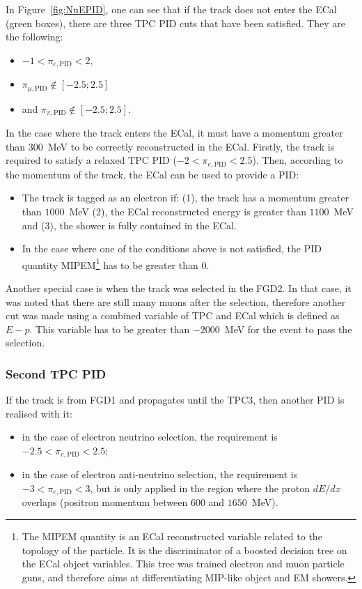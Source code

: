 In Figure~\ref{fig:NuEPID}, one can see that if the track does not
enter the \Gls{ECal} (green boxes), there are three \Gls{TPC}
\Gls{PID} cuts that have been satisfied. They are the following:
\begin{itemize}[noitemsep,topsep=0pt]
\item $-1<\pi_{e, \text{PID}} < 2$,
\item $\pi_{\mu, \text{PID}} \notin \left[-2.5;2.5\right]$
\item and $\pi_{\pi, \text{PID}} \notin \left[-2.5;2.5\right]$.
\end{itemize}

In the case where the track enters the \Gls{ECal}, it must have a
momentum greater than $300$~MeV to be correctly reconstructed in the
\Gls{ECal}. Firstly, the track is required to satisfy a relaxed
\Gls{TPC} \Gls{PID} ($-2<\pi_{e,\text{PID}} < 2.5$). Then,
according to the momentum of the track, the \Gls{ECal} can be used to
provide a \Gls{PID}:
\begin{itemize}[noitemsep,topsep=0pt]
\item The track is tagged as an electron if: (1), the track has a
  momentum greater than $1000$~MeV (2), the \Gls{ECal} reconstructed
  energy is greater than $1100$~MeV and (3), the shower is fully
  contained in the \Gls{ECal}.
\item In the case where one of the conditions above is not satisfied,
  the \Gls{PID} quantity \Gls{MIPEM}\footnote{The \Gls{MIPEM} quantity
    is an \Gls{ECal} reconstructed variable related to the topology of
    the particle. It is the discriminator of a boosted decision tree
    on the \Gls{ECal} object variables. This tree was trained electron
    and muon particle guns, and therefore aims at differentiating
    \Gls{MIP}-like object and \Gls{EM} showers.} has to be greater
  than 0.
\end{itemize}

Another special case is when the track was selected in the
\Gls{FGD}2. In that case, it was noted that there are still many muons
after the selection, therefore another cut was made using a combined
variable of \Gls{TPC} and \Gls{ECal} which is defined as $E-p$. This
variable has to be greater than $-2000$~MeV for the event to pass the
selection.

\subsubsection{Second \Gls{TPC} \Gls{PID}}
\label{subsubsec:secondtpcpid}
If the track is from \Gls{FGD}1 and propagates until the \Gls{TPC}3,
then another \Gls{PID} is realised with it:
\begin{itemize}[noitemsep,topsep=0pt]
\item in the case of electron neutrino selection, the requirement is
  $-2.5<\pi_{e, \text{PID}} < 2.5$;
\item in the case of electron anti-neutrino selection, the requirement
  is $-3<\pi_{e, \text{PID}} < 3$, but is only applied in the region
  where the proton $dE/dx$ overlaps (positron momentum between $600$
  and $1650$~MeV).
\end{itemize}

